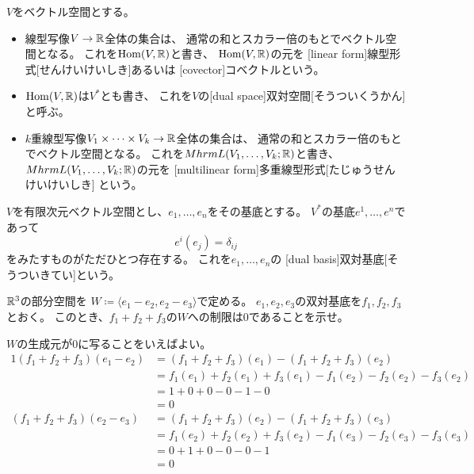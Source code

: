 \documentclass[report]{jlreq}
\begin{document}
\begin{definition}[多重線型写像のなすベクトル空間]
    $V$をベクトル空間とする。
    \begin{itemize}
        \item 線型写像$V \to \mathbb{R}$全体の集合は、
            通常の和とスカラー倍のもとでベクトル空間となる。
            これを$\operatorname{Hom}(V, \mathbb{R})$と書き、
            $\operatorname{Hom}(V, \mathbb{R})$の元を
            [linear form]{線型形式}[せんけいけいしき]あるいは
            [covector]{コベクトル}という。
        \item $\operatorname{Hom}(V, \mathbb{R})$は$V^*$とも書き、
            これを$V$の[dual space]{双対空間}[そうついくうかん]
            と呼ぶ。
        \item $k$重線型写像$V_1 \times \dots \times V_k \to \mathbb{R}$全体の集合は、
            通常の和とスカラー倍のもとでベクトル空間となる。
            これを$Mhrm{L}(V_1, \dots, V_k; \mathbb{R})$と書き、
            $Mhrm{L}(V_1, \dots, V_k; \mathbb{R})$の元を
            [multilinear form]{多重線型形式}[たじゅうせんけいけいしき]
            という。
    \end{itemize}
\end{definition}

\begin{definition}[双対基底]
    $V$を有限次元ベクトル空間とし、$e_1, \dots, e_n$をその基底とする。
    $V^*$の基底$e^1, \dots, e^n$であって
    \begin{equation}
        e^i (e_j) = \delta_{ij}
    \end{equation}
    をみたすものがただひとつ存在する。
    これを$e_1, \dots, e_n$の
    [dual basis]{双対基底}[そうついきてい]という。
\end{definition}

\begin{problem}[{[斎藤] A4.1.1}]
    $\mathbb{R}^3$の部分空間を
    $W \coloneqq \langle e_1 - e_2, e_2 - e_3 \rangle$で定める。
    $e_1, e_2, e_3$の双対基底を$f_1, f_2, f_3$とおく。
    このとき、$f_1 + f_2 + f_3$の$W$への制限は$0$であることを示せ。
\end{problem}

\begin{answer}
    $W$の生成元が$0$に写ることをいえばよい。
    \begin{alignat}{1}
        (f_1 + f_2 + f_3)(e_1 - e_2)
            &= (f_1 + f_2 + f_3)(e_1)
                - (f_1 + f_2 + f_3)(e_2) \\
            &= f_1(e_1) + f_2(e_1) + f_3(e_1)
                - f_1(e_2) - f_2(e_2) - f_3(e_2) \\
            &= 1 + 0 + 0 - 0 - 1 - 0 \\
            &= 0 \\
        (f_1 + f_2 + f_3)(e_2 - e_3)
            &= (f_1 + f_2 + f_3)(e_2)
                - (f_1 + f_2 + f_3)(e_3) \\
            &= f_1(e_2) + f_2(e_2) + f_3(e_2)
                - f_1(e_3) - f_2(e_3) - f_3(e_3) \\
            &= 0 + 1 + 0 - 0 - 0 - 1 \\
            &= 0
    \end{alignat}
\end{answer}
\end{document}
